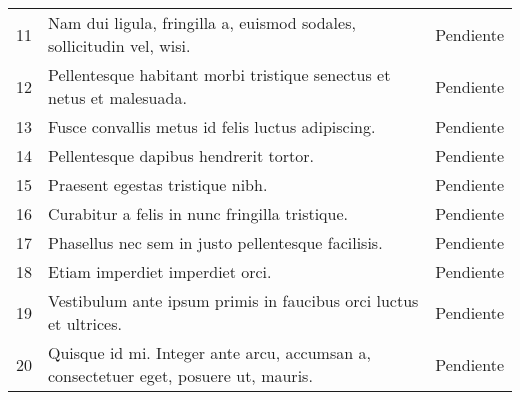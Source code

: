 \begin{longtable}{|c|p{10cm}|c|}
	11 & Nam dui ligula, fringilla a, euismod sodales, sollicitudin vel, wisi. & Pendiente \\
	12 & Pellentesque habitant morbi tristique senectus et netus et malesuada. & Pendiente \\
	13 & Fusce convallis metus id felis luctus adipiscing. & Pendiente \\
	14 & Pellentesque dapibus hendrerit tortor. & Pendiente \\
	15 & Praesent egestas tristique nibh. & Pendiente \\
	16 & Curabitur a felis in nunc fringilla tristique. & Pendiente \\
	17 & Phasellus nec sem in justo pellentesque facilisis. & Pendiente \\
	18 & Etiam imperdiet imperdiet orci. & Pendiente \\
	19 & Vestibulum ante ipsum primis in faucibus orci luctus et ultrices. & Pendiente \\
	20 & Quisque id mi. Integer ante arcu, accumsan a, consectetuer eget, posuere ut, mauris. & Pendiente \\
\end{longtable}